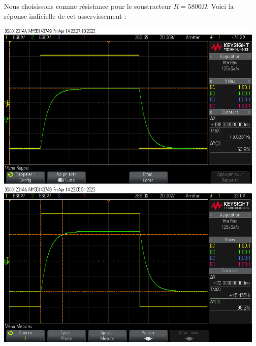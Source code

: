 \documentclass[12pt]{article}
\begin{document}
Nous choisissons comme résistance pour le soustracteur $R= 5800 \Omega$. Voici la réponse indicielle de cet asservissement : 
\begin{center}
    \includegraphics[width = 19cm]{TP3/Syst_1/P/14_04_2023_gs_k1_.png}
    \includegraphics[width = 19cm]{TP3/Syst_1/P/14_04_2023_tr5_k1.png}
\end{center}
\end{document}
